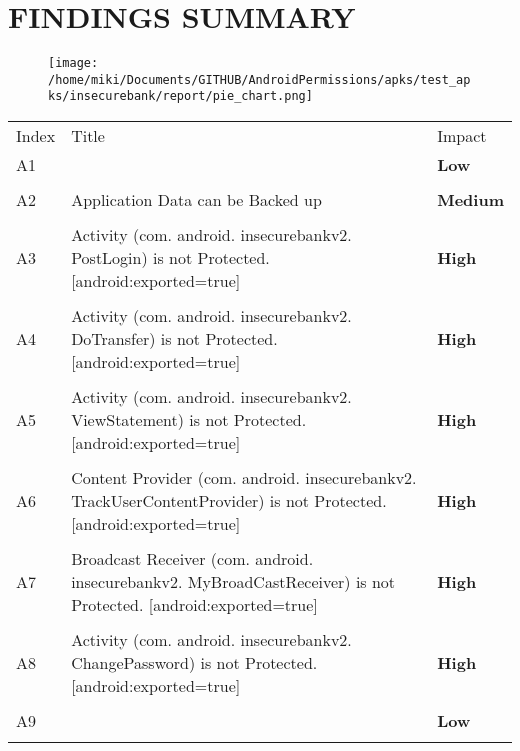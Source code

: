 \documentclass[12p]{article}
\begin{document}
\section{FINDINGS SUMMARY}\label{sec:summary}
\begin{figure}[H]
\centering
	\texttt{[image: /home/miki/Documents/GITHUB/AndroidPermissions/apks/test\_apks/insecurebank/report/pie\_chart.png]}
\end{figure}
	\begin{longtable}{p{0.5cm} p{10cm} p{1.5cm}}
	\rowcolor{grannysmithapple!70} Index & Title & Impact \\
	A1&& \color{amber}\textbf{Low} \\
\hline\\	A2&Application Data can be Backed up& \color{orange(colorwheel)}\textbf{Medium} \\
\hline\\	A3&Activity \newline (com. android. insecurebankv2. PostLogin) is not Protected. [android:exported=true]& \color{ferrarired}\textbf{High} \\
\hline\\	A4&Activity \newline (com. android. insecurebankv2. DoTransfer) is not Protected. [android:exported=true]& \color{ferrarired}\textbf{High} \\
\hline\\	A5&Activity \newline (com. android. insecurebankv2. ViewStatement) is not Protected. [android:exported=true]& \color{ferrarired}\textbf{High} \\
\hline\\	A6&Content Provider \newline (com. android. insecurebankv2. TrackUserContentProvider) is not Protected. [android:exported=true]& \color{ferrarired}\textbf{High} \\
\hline\\	A7&Broadcast Receiver \newline (com. android. insecurebankv2. MyBroadCastReceiver) is not Protected. [android:exported=true]& \color{ferrarired}\textbf{High} \\
\hline\\	A8&Activity \newline (com. android. insecurebankv2. ChangePassword) is not Protected. [android:exported=true]& \color{ferrarired}\textbf{High} \\
\hline\\	A9&& \color{amber}\textbf{Low} \\
\hline\\	\end{longtable}
\cleardoublepage
\end{document}
